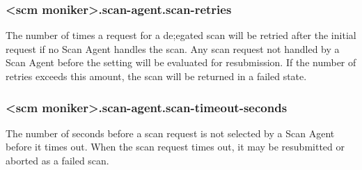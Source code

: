 \subsubsection{<scm moniker>.scan-agent.scan-retries}\label{sec:scan-agent-scan-retries}
The number of times a request for a de;egated scan will be retried after the initial request if no Scan Agent handles the scan.
Any scan request not handled by a Scan Agent before the  setting 
will be evaluated for resubmission.  If the number of retries exceeds this amount, the scan will be returned in a failed state.

\subsubsection{<scm moniker>.scan-agent.scan-timeout-seconds}\label{sec:scan-agent-scan-timeout-seconds}
The number of seconds before a scan request is not selected by a Scan Agent before it times out.  When the scan
request times out, it may be resubmitted or aborted as a failed scan.
